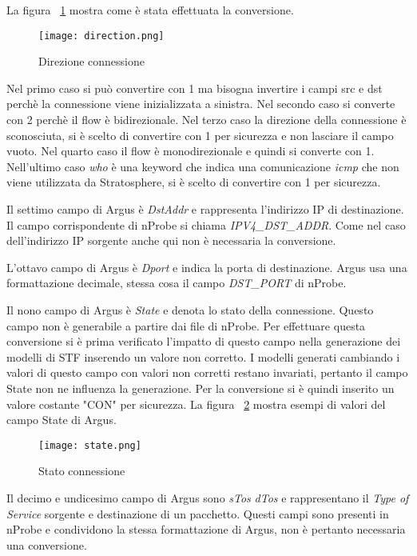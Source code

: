 \documentclass[../main.tex]{subfiles}
\begin{document}
La figura ~\ref{fig:direction} mostra come è stata effettuata la conversione.
\begin{figure}[H]
				\centering
\texttt{[image: direction.png]}
				\caption{Direzione connessione}
				\label{fig:direction}
\end{figure}
Nel primo caso si può convertire con 1 ma bisogna invertire i campi src e dst perchè la connessione viene inizializzata a sinistra. Nel secondo caso si converte con 2 perchè il flow è bidirezionale. Nel terzo caso la direzione della connessione è sconosciuta, si è scelto di convertire con 1 per sicurezza e non lasciare il campo vuoto. Nel quarto caso il flow è monodirezionale e quindi si converte con 1. Nell'ultimo caso \textit{who} è una keyword che indica una comunicazione \textit{icmp} che non viene utilizzata da Stratosphere, si è scelto di convertire con 1 per sicurezza.

Il settimo campo di Argus è \textit{DstAddr} e rappresenta l'indirizzo IP di destinazione. Il campo corrispondente di nProbe si chiama \textit{IPV4\_DST\_ADDR}. Come nel caso dell'indirizzo IP sorgente anche qui non è necessaria la conversione.

L'ottavo campo di Argus è \textit{Dport} e indica la porta di destinazione. Argus usa una formattazione decimale, stessa cosa il campo \textit{DST\_PORT} di nProbe.

Il nono campo di Argus è \textit{State} e denota lo stato della connessione. Questo campo non è generabile a partire dai file di nProbe. Per effettuare questa conversione si è prima verificato l'impatto di questo campo nella generazione dei modelli di STF inserendo un valore non corretto. I modelli generati cambiando i valori di questo campo con valori non corretti restano invariati, pertanto il campo State non ne influenza la generazione. Per la conversione si è quindi inserito un valore costante "CON" per sicurezza. La figura ~\ref{fig:state} mostra esempi di valori del campo State di Argus.
\begin{figure}[H]
				\centering
\texttt{[image: state.png]}
				\caption{Stato connessione}
				\label{fig:state}
\end{figure}

Il decimo e undicesimo campo di Argus sono \textit{sTos} \textit{dTos} e rappresentano il \textit{Type of Service} sorgente e destinazione di un pacchetto. Questi campi sono presenti in nProbe e condividono la stessa formattazione di Argus, non è pertanto necessaria una conversione.
\end{document}
